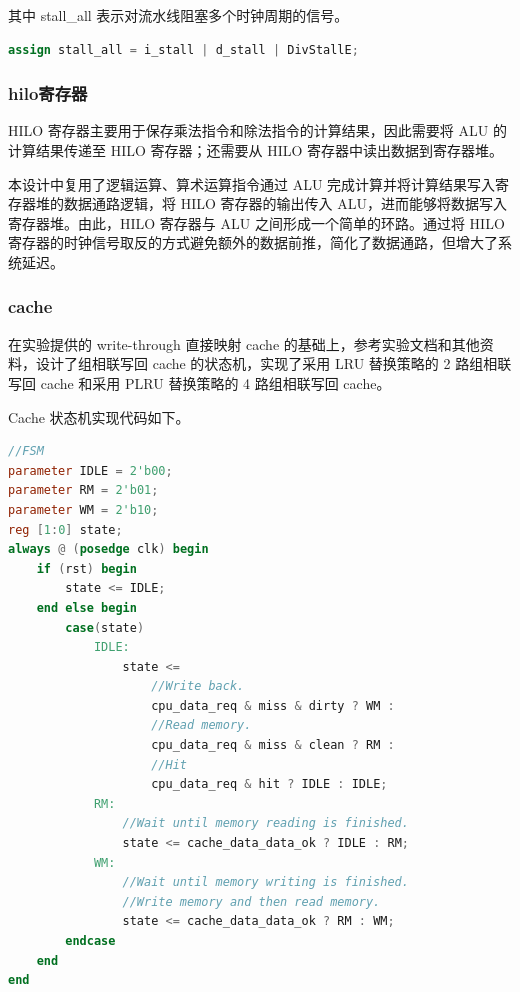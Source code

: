 其中 stall\_all 表示对流水线阻塞多个时钟周期的信号。

\begin{lstlisting}[language=Verilog]
assign stall_all = i_stall | d_stall | DivStallE;
\end{lstlisting}

\subsubsection{hilo寄存器}

HILO 寄存器主要用于保存乘法指令和除法指令的计算结果，因此需要将 ALU 的计算结果传递至 HILO 寄存器；还需要从 HILO 寄存器中读出数据到寄存器堆。

本设计中复用了逻辑运算、算术运算指令通过 ALU 完成计算并将计算结果写入寄存器堆的数据通路逻辑，将 HILO 寄存器的输出传入 ALU，进而能够将数据写入寄存器堆。由此，HILO 寄存器与 ALU 之间形成一个简单的环路。通过将 HILO 寄存器的时钟信号取反的方式避免额外的数据前推，简化了数据通路，但增大了系统延迟。

\subsubsection{cache}

在实验提供的 write-through 直接映射 cache 的基础上，参考实验文档和其他资料，设计了组相联写回 cache 的状态机，实现了采用 LRU 替换策略的 2 路组相联写回 cache 和采用 PLRU 替换策略的 4 路组相联写回 cache。

Cache 状态机实现代码如下。

\begin{lstlisting}[language=Verilog]
//FSM
parameter IDLE = 2'b00;
parameter RM = 2'b01;
parameter WM = 2'b10;
reg [1:0] state;
always @ (posedge clk) begin
    if (rst) begin
        state <= IDLE;
    end else begin
        case(state)
            IDLE:
                state <=
                    //Write back. 
                    cpu_data_req & miss & dirty ? WM :
                    //Read memory.
                    cpu_data_req & miss & clean ? RM :
                    //Hit
                    cpu_data_req & hit ? IDLE : IDLE;
            RM:
                //Wait until memory reading is finished.
                state <= cache_data_data_ok ? IDLE : RM;
            WM:
                //Wait until memory writing is finished.
                //Write memory and then read memory.
                state <= cache_data_data_ok ? RM : WM;
        endcase
    end
end
\end{lstlisting}

